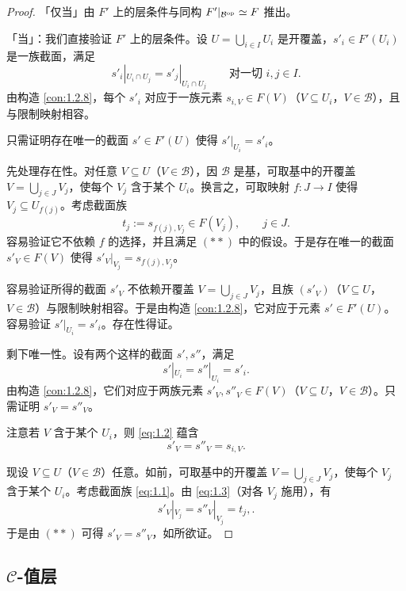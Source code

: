 \begin{proof}
「仅当」由 $F'$ 上的层条件与同构 $F'|_{\mathcal B^{\mathrm{op}}}\simeq F$ 推出。

「当」：我们直接验证 $F'$ 上的层条件。设 $U=\bigcup_{i\in I}U_i$ 是开覆盖，$s'_i\in F'(U_i)$ 是一族截面，满足
\[
s'_i|_{U_i\cap U_j}=s'_j|_{U_i\cap U_j}\qquad\text{对一切 } i,j\in I.
\]
由构造 \ref{con:1.2.8}，每个 $s'_i$ 对应于一族元素 $s_{i,V}\in F(V)$（$V\subseteq U_i$，$V\in\mathcal B$），且与限制映射相容。

只需证明存在唯一的截面 $s'\in F'(U)$ 使得 $s'|_{U_i}=s'_i$。

先处理存在性。对任意 $V\subseteq U$（$V\in\mathcal B$），因 $\mathcal B$ 是基，可取基中的开覆盖 $V=\bigcup_{j\in J}V_j$，使每个 $V_j$ 含于某个 $U_i$。换言之，可取映射 $f\colon J\to I$ 使得 $V_j\subseteq U_{f(j)}$。考虑截面族
\begin{equation}\tag{1.1}\label{eq:1.1}
t_j:=s_{f(j),V_j}\in F(V_j),\qquad j\in J.
\end{equation}
容易验证它不依赖 $f$ 的选择，并且满足 $(**)$ 中的假设。于是存在唯一的截面 $s'_V\in F(V)$ 使得 $s'_V|_{V_j}=s_{f(j),V_j}$。

容易验证所得的截面 $s'_V$ 不依赖开覆盖 $V=\bigcup_{j\in J}V_j$，且族 $(s'_V)$（$V\subseteq U$，$V\in\mathcal B$）与限制映射相容。于是由构造 \ref{con:1.2.8}，它对应于元素 $s'\in F'(U)$。容易验证 $s'|_{U_i}=s'_i$。存在性得证。

剩下唯一性。设有两个这样的截面 $s',s''$，满足
\begin{equation}\tag{1.2}\label{eq:1.2}
s'|_{U_i}=s''|_{U_i}=s'_i.
\end{equation}
由构造 \ref{con:1.2.8}，它们对应于两族元素 $s'_V,s''_V\in F(V)$（$V\subseteq U$，$V\in\mathcal B$）。只需证明 $s'_V=s''_V$。

注意若 $V$ 含于某个 $U_i$，则 \eqref{eq:1.2} 蕴含
\begin{equation}\tag{1.3}\label{eq:1.3}
s'_V=s''_V=s_{i,V}.
\end{equation}

现设 $V\subseteq U$（$V\in\mathcal B$）任意。如前，可取基中的开覆盖 $V=\bigcup_{j\in J}V_j$，使每个 $V_j$ 含于某个 $U_i$。考虑截面族 \eqref{eq:1.1}。由 \eqref{eq:1.3}（对各 $V_j$ 施用），有
\[
s'_V|_{V_j}=s''_V|_{V_j}=t_j,.
\]
于是由 $(**)$ 可得 $s'_V=s''_V$，如所欲证。
\end{proof}

\subsection{$\mathcal C$-值层}\label{sec:1.3}

